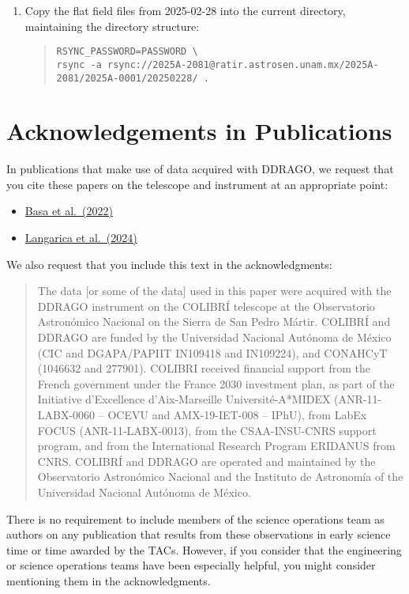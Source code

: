 \begin{enumerate}
\item
Copy the flat field files from 2025-02-28 into the current directory, maintaining the directory structure:
\begin{quote}\footnotesize\begin{verbatim}
RSYNC_PASSWORD=PASSWORD \
rsync -a rsync://2025A-2081@ratir.astrosen.unam.mx/2025A-2081/2025A-0001/20250228/ .
\end{verbatim}
\end{quote}

\end{enumerate}

\section{Acknowledgements in Publications}

In publications that make use of data acquired with DDRAGO, we request that you cite these papers on the telescope and instrument at an appropriate point:

\begin{itemize}
\item \href{https://ui.adsabs.harvard.edu/abs/2022SPIE12182E..1SB/abstract}{Basa et al.\ (2022)}
\item \href{https://ui.adsabs.harvard.edu/abs/2024SPIE13096E..3DL/abstract}{Langarica et al.\ (2024)}

\end{itemize}

We also request that you include this text in the acknowledgments:

\begin{quote}
The data [or some of the data] used in this paper were acquired with the DDRAGO instrument on the COLIBRÍ telescope at the Observatorio Astronómico Nacional on the Sierra de San Pedro Mártir. COLIBRÍ and DDRAGO are funded by the Universidad Nacional Autónoma de México (CIC and DGAPA/PAPIIT IN109418 and IN109224), and CONAHCyT (1046632 and 277901). COLIBRI received financial support from the French government under the France 2030 investment plan, as part of the Initiative d’Excellence d’Aix-Marseille Université-A*MIDEX  (ANR-11-LABX-0060 -- OCEVU and AMX-19-IET-008 -- IPhU), from LabEx FOCUS (ANR-11-LABX-0013), from the CSAA-INSU-CNRS support program, and from the International Research Program ERIDANUS from CNRS. COLIBRÍ and DDRAGO are operated and maintained by the Observatorio Astronómico Nacional and the Instituto de Astronomía of the Universidad Nacional Autónoma de México.
\end{quote}

There is no requirement to include members of the science operations team as authors on any publication that results from these observations in early science time or time awarded by the TACs. However, if you consider that the engineering or science operations teams have been especially helpful, you might consider mentioning them in the acknowledgments.